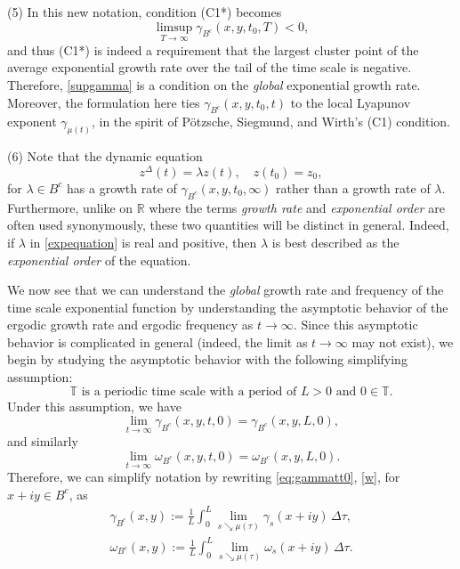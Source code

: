 \documentclass[reqno]{amsart}
\begin{document}
\begin{remark}
(5) In this new notation, condition (C1*) becomes
 \begin{equation} \label{supgamma}
 \limsup_{T \to \infty} \gamma_{B^c}(x,y,t_0,T) < 0,
 \end{equation}
and thus (C1*) is indeed a requirement that the largest cluster point of the average
exponential growth rate over the tail of the time scale is negative.
Therefore, \eqref{supgamma} is a condition on the \emph{global} exponential growth rate.
 Moreover, the formulation here ties $\gamma_{B^c}(x,y,t_0,t)$ to the local Lyapunov
 exponent $\gamma_{\mu(t)}$, in the spirit of P\"otzsche, Siegmund, and Wirth's
 (C1) condition.

(6) Note that the dynamic equation
\begin{equation}
z^{\Delta}(t)=\lambda z(t), \quad z(t_0)=z_0,
\label{expequation}
\end{equation}
for $\lambda \in B^c$ has a growth rate of $\gamma_{B^c}(x,y,t_0,\infty)$ rather than a growth rate of $\lambda$. Furthermore, unlike on $\mathbb{R}$ where the terms \emph{growth rate} and \emph{exponential order} are often used synonymously, these two quantities will be distinct in general. Indeed, if $\lambda$ in \eqref{expequation} is real and positive, then $\lambda$ is best described as the \emph{exponential order} of the equation.
 \end{remark}

We now see that we can understand the \emph{global} growth rate and frequency of the
time scale exponential function by understanding the asymptotic behavior of the
ergodic growth rate and ergodic frequency as $t\to\infty$.
 Since this asymptotic behavior is complicated in general (indeed, the limit as
$t\to\infty$ may not exist), we begin by studying the asymptotic behavior with the
following simplifying assumption:
\begin{equation}
\mathbb{T} \text{ is a periodic time scale with a period of } L>0
\text{ and }0 \in \mathbb{T}.
\tag{P}
\label{P}
\end{equation}
Under this assumption, we have
\[
\lim_{t \to \infty} \gamma_{B^c}(x,y,t,0) = \gamma_{B^c}(x,y,L,0),
\]
and similarly
\[
\lim_{t \to \infty} \omega_{B^c}(x,y,t,0) = \omega_{B^c}(x,y,L,0).
\]
Therefore, we can simplify notation by rewriting \eqref{eq:gammatt0}, \eqref{w},
for $x+iy \in B^c$, as
\begin{gather}
 \gamma_{B^c}(x,y) :=\frac{1}{L}\int_0^{L} \lim_{s \searrow
\mu(\tau)} \gamma_s(x+iy)\,\Delta \tau, \label{g21} \\
\omega_{B^c}(x,y) := \frac{1}{L}\int_{0}^{L} \lim_{s \searrow
\mu(\tau)} \omega_s(x+iy)\,\Delta \tau.\label{w1}
\end{gather}
\end{document}
